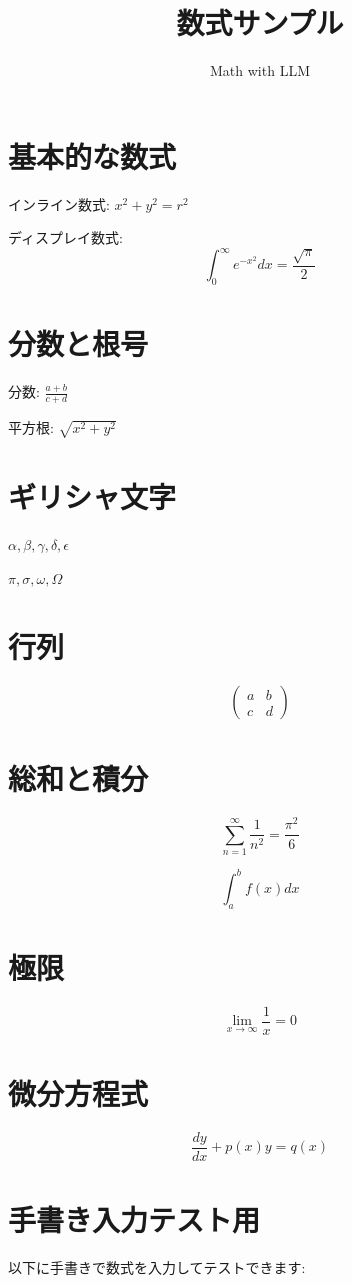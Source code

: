 \documentclass{article}
\title{数式サンプル}
\author{Math with LLM}
\date{}
\begin{document}
\maketitle

\section{基本的な数式}

インライン数式: $x^2 + y^2 = r^2$

ディスプレイ数式:
$$\int_0^\infty e^{-x^2} dx = \frac{\sqrt{\pi}}{2}$$

\section{分数と根号}

分数: $\frac{a + b}{c + d}$

平方根: $\sqrt{x^2 + y^2}$

\section{ギリシャ文字}

$\alpha, \beta, \gamma, \delta, \epsilon$

$\pi, \sigma, \omega, \Omega$

\section{行列}

$$
\begin{pmatrix}
a & b \\
c & d
\end{pmatrix}
$$

\section{総和と積分}

$$\sum_{n=1}^{\infty} \frac{1}{n^2} = \frac{\pi^2}{6}$$

$$\int_a^b f(x) dx$$

\section{極限}

$$\lim_{x \to \infty} \frac{1}{x} = 0$$

\section{微分方程式}

$$\frac{dy}{dx} + p(x)y = q(x)$$

\section{手書き入力テスト用}

以下に手書きで数式を入力してテストできます:
\end{document}
